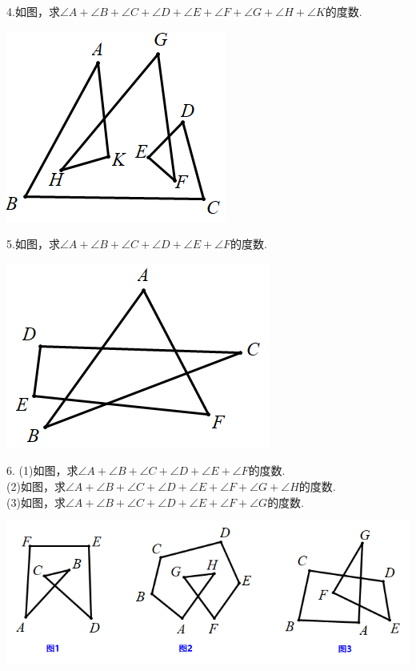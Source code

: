 \documentclass[10pt,twocolumn]{ctexart}
\begin{document}
4.如图，求$\angle A+\angle B+\angle C+\angle D+\angle E+\angle F+\angle G+\angle H+\angle K$的度数.

 \includegraphics[scale=0.5]{figure/bazhi12.PNG}
 
5.如图，求$\angle A+\angle B+\angle C+\angle D+\angle E+\angle F$的度数.

 \includegraphics[scale=0.5]{figure/bazhi15.PNG}
 
6. (1)如图，求$\angle A+\angle B+\angle C+\angle D+\angle E+\angle F$的度数.\\
    (2)如图，求$\angle A+\angle B+\angle C+\angle D+\angle E+\angle F+\angle G+\angle H$的度数.\\
    (3)如图，求$\angle A+\angle B+\angle C+\angle D+\angle E+\angle F+\angle G$的度数.
    
 \includegraphics[scale=0.5]{figure/bazhi13.PNG}
 
\end{document}
